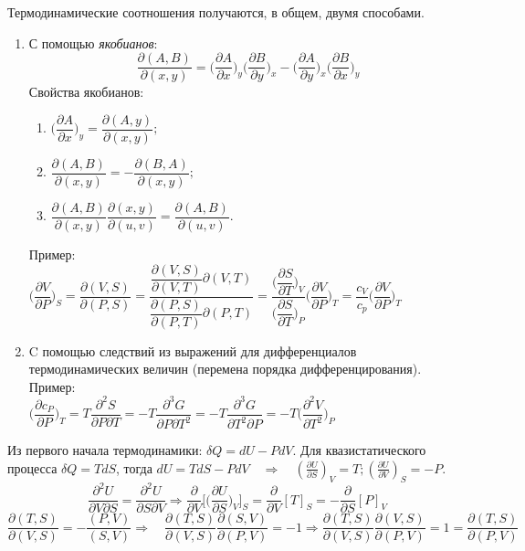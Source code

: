 \documentclass[14pt,a4paper]{scrartcl}
\begin{document}
	\quad Термодинамические соотношения получаются, в общем, двумя способами.
	\begin{enumerate} \item С помощью \textit{якобианов}: 
	$$\dfrac{\partial (A, B)}{\partial (x,y)} = \biggl(\dfrac{\partial A}{\partial x}\biggr)_y\biggl(\dfrac{\partial B}{\partial y}\biggr)_x - \biggl(\dfrac{\partial A}{\partial y}\biggr)_x\biggl(\dfrac{\partial B}{\partial x}\biggr)_y$$
	Свойства якобианов: 
		\begin{enumerate}
		\item $\biggl(\dfrac{\partial A}{\partial x}\biggr)_y = \dfrac{\partial (A, y)}{\partial (x,y)};$
		\item $\dfrac{\partial (A, B)}{\partial (x,y)} = -\dfrac{\partial (B, A)}{\partial (x,y)};$
		\item $\dfrac{\partial (A, B)}{\partial(x,y)}\dfrac{\partial (x, y)}{\partial (u, v)} = \dfrac{\partial (A,B)}{\partial(u,v)}.$
		\end{enumerate}
	
	Пример: \\$\biggl(\dfrac{\partial V}{\partial P}\biggr)_S = \dfrac{\partial(V,S)}{\partial(P,S)} = \dfrac{\dfrac{\partial(V,S)}{\partial(V,T)}\partial(V,T)}{\dfrac{\partial(P,S)}{\partial(P,T)}\partial(P,T)} = \dfrac{\biggl(\dfrac{\partial S}{\partial T}\biggr)_V}{\biggl(\dfrac{\partial S}{\partial T}\biggr)_P}\biggl(\dfrac{\partial V}{\partial P}\biggr)_T = \dfrac{c_V}{c_p}\biggl(\dfrac{\partial V}{\partial P}\biggr)_T$
	\item C помощью следствий из выражений для дифференциалов термодинамических величин
	(перемена порядка дифференцирования). \\
	Пример:\\
	$\biggl(\dfrac{\partial c_P}{\partial P}\biggr)_T = T\dfrac{\partial^2 S}{\partial P \partial T} = -T\dfrac{\partial^3 G}{\partial P\partial T^2} = -T\dfrac{\partial^3 G}{\partial T^2\partial P} = -T\biggl(\dfrac{\partial ^2 V}{\partial T^2}\biggr)_P$
\end{enumerate}

	\quad Из первого начала термодинамики: $\delta Q = dU - PdV$. Для квазистатического процесса $\delta Q = TdS$, тогда $dU = TdS - PdV \quad \Rightarrow \quad (\frac{\partial U}{\partial S})_V = T; (\frac{\partial U}{\partial V})_S = -P$.\\
	
	$$\dfrac{\partial^2 U}{\partial V \partial S} =\dfrac{\partial^2 U}{\partial S \partial V} \Rightarrow \dfrac{\partial }{\partial V}\biggl[\biggl(\dfrac{\partial U}{\partial S}\biggr)_V\biggr]_S = \dfrac{\partial }{\partial V}[T]_S = -\dfrac{\partial }{\partial S}[P]_V $$
	$$\dfrac{\partial(T,S) }{\partial (V,S)}=-\dfrac{(P,V)}{(S,V)}\Rightarrow \quad \dfrac{\partial (T,S)}{\partial (V,S)}\dfrac{\partial (S,V)}{\partial (P,V)}=-1 \Rightarrow \dfrac{\partial (T,S)}{\partial (V,S)}\dfrac{\partial (V,S)}{\partial (P,V)} = \boxed{1 = \dfrac{\partial (T,S)}{\partial (P,V)}}$$
	
\end{document}
